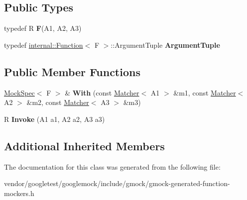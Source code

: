 \subsection*{Public Types}
\begin{DoxyCompactItemize}
\item 
\mbox{\label{classtesting_1_1internal_1_1_function_mocker_3_01_r_07_a1_00_01_a2_00_01_a3_08_4_a8c471830f963b8012785eb3eeca2cc9c}} 
typedef R {\bfseries F}(A1, A2, A3)
\item 
\mbox{\label{classtesting_1_1internal_1_1_function_mocker_3_01_r_07_a1_00_01_a2_00_01_a3_08_4_a347dcf4c054a5f1fbd0e2f0ad1c5e2f3}} 
typedef \mbox{\hyperlink{structtesting_1_1internal_1_1_function}{internal\+::\+Function}}$<$ F $>$\+::Argument\+Tuple {\bfseries Argument\+Tuple}
\end{DoxyCompactItemize}
\subsection*{Public Member Functions}
\begin{DoxyCompactItemize}
\item 
\mbox{\label{classtesting_1_1internal_1_1_function_mocker_3_01_r_07_a1_00_01_a2_00_01_a3_08_4_a349af66650c6d0401dd1c0081773c25a}} 
\mbox{\hyperlink{classtesting_1_1internal_1_1_mock_spec}{Mock\+Spec}}$<$ F $>$ \& {\bfseries With} (const \mbox{\hyperlink{classtesting_1_1_matcher}{Matcher}}$<$ A1 $>$ \&m1, const \mbox{\hyperlink{classtesting_1_1_matcher}{Matcher}}$<$ A2 $>$ \&m2, const \mbox{\hyperlink{classtesting_1_1_matcher}{Matcher}}$<$ A3 $>$ \&m3)
\item 
\mbox{\label{classtesting_1_1internal_1_1_function_mocker_3_01_r_07_a1_00_01_a2_00_01_a3_08_4_a2afad9e39ca64acc6b178fa415907c5b}} 
R {\bfseries Invoke} (A1 a1, A2 a2, A3 a3)
\end{DoxyCompactItemize}
\subsection*{Additional Inherited Members}


The documentation for this class was generated from the following file\+:\begin{DoxyCompactItemize}
\item 
vendor/googletest/googlemock/include/gmock/gmock-\/generated-\/function-\/mockers.\+h\end{DoxyCompactItemize}
